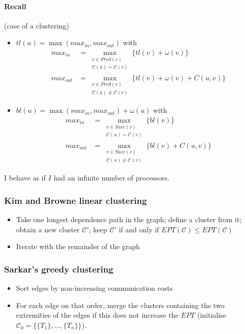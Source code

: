 \paragraph{Recall} (case of a clustering)
\begin{itemize}
\item $tl(u)=\max (max_{in},max_{out})$ with
\begin{align*}
max_{in}&=\max_{\substack{v\in Pred(v)\\\mathcal{C}(u)=\mathcal{C}(v)}} \{ tl(v)+\omega (v) \}\\
max_{out}&=\max_{\substack{v\in Pred(v)\\\mathcal{C}(u)\neq\mathcal{C}(v)}} \{ tl(v)+\omega (v) + C(u,v) \}
\end{align*}

\item $bl(u)=\max (max_{in},max_{out}) + \omega(u)$ with
\begin{align*}
max_{in}&=\max_{\substack{v\in Succ(v)\\\mathcal{C}(u)=\mathcal{C}(v)}} \{ bl(v) \}\\
max_{out}&=\max_{\substack{v\in Succ(v)\\\mathcal{C}(u)\neq\mathcal{C}(v)}} \{ bl(v) + C(u,v) \}
\end{align*}
\end{itemize}

I behave as if $I$ had an infinite number of processors.

\subsubsection*{Kim and Browne linear clustering}
\begin{itemize}
\item Take one longest dependence path in the graph; define a cluster from it; obtain a new cluster $\mathcal{C}'$; keep $\mathcal{C}'$ if and only if $EPT(\mathcal{C})\leq EPT(\mathcal{C})$
\item Iterate with the remainder of the graph
\end{itemize}


\subsubsection*{Sarkar's greedy clustering}
\begin{itemize}
\item Sort edges by non-increasing communication costs
\item For each edge on that order, merge the clusters containing the two extremities of the edges if this does not increase the $EPT$ (initialise $\mathcal{C}_0=\{\{T_1\},...,\{T_n\}\}$).
\end{itemize}


